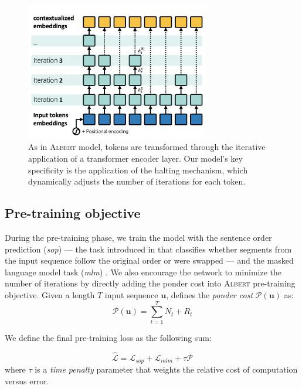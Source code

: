 \begin{figure}[!htb]
\begin{center}
\includegraphics[width=8cm]{images/model-3.png}
\end{center}
\caption{As in \textsc{Albert}  model, tokens are transformed through the iterative application of a transformer encoder layer. Our model's key specificity is the application of the halting mechanism, which dynamically adjusts the number of iterations for each token.
}
\end{figure}

\subsection{Pre-training objective}

During the pre-training phase, we train the model with the sentence order prediction (\textit{sop}) — the task introduced in \textcite{lan_20} that classifies whether segments from the input sequence follow the original order or were swapped — and the masked language model task (\textit{mlm}) \parencite{devlin_19}. We also encourage the network to minimize the number of iterations by directly adding the ponder cost into \textsc{Albert}  pre-training objective. Given a length $T$ input sequence $\textbf{u}$,  \textcite{graves_16} defines the \emph{ponder cost} $\mathcal{P}(\textbf{u})$ as:
\begin{equation}
\mathcal{P}(\textbf{u}) = \sum_{t=1}^T N_{t} + R_t \label{eq:ponder-cost}
\end{equation}

We define the final pre-training loss as the following sum:

\begin{equation}
\hat{\mathcal{L}} = \mathcal{L}_{sop} + \mathcal{L}_{mlm} + \tau \mathcal{P} \label{eq:ponder-loss}
\end{equation}
where $\tau$ is a \emph{time penalty} parameter that weights the relative cost of computation versus error.

